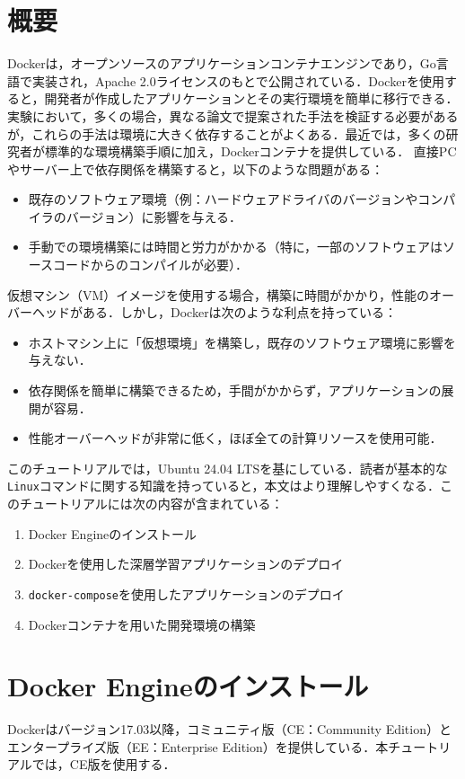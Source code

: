 \section{概要}
Dockerは，オープンソースのアプリケーションコンテナエンジンであり，Go言語で実装され，Apache 2.0ライセンスのもとで公開されている．Dockerを使用すると，開発者が作成したアプリケーションとその実行環境を簡単に移行できる．
実験において，多くの場合，異なる論文で提案された手法を検証する必要があるが，これらの手法は環境に大きく依存することがよくある．最近では，多くの研究者が標準的な環境構築手順に加え，Dockerコンテナを提供している．
直接PCやサーバー上で依存関係を構築すると，以下のような問題がある：
\begin{itemize}
    \item 既存のソフトウェア環境（例：ハードウェアドライバのバージョンやコンパイラのバージョン）に影響を与える．
    \item 手動での環境構築には時間と労力がかかる（特に，一部のソフトウェアはソースコードからのコンパイルが必要）．
\end{itemize}

仮想マシン（VM）イメージを使用する場合，構築に時間がかかり，性能のオーバーヘッドがある．しかし，Dockerは次のような利点を持っている：
\begin{itemize}
    \item ホストマシン上に「仮想環境」を構築し，既存のソフトウェア環境に影響を与えない．
    \item 依存関係を簡単に構築できるため，手間がかからず，アプリケーションの展開が容易．
    \item 性能オーバーヘッドが非常に低く，ほぼ全ての計算リソースを使用可能．
\end{itemize}

このチュートリアルでは，Ubuntu 24.04 LTSを基にしている．読者が基本的な\texttt{Linux}コマンドに関する知識を持っていると，本文はより理解しやすくなる．このチュートリアルには次の内容が含まれている：
\begin{enumerate}
    \item Docker Engineのインストール
    \item Dockerを使用した深層学習アプリケーションのデプロイ
    \item \texttt{docker-compose}を使用したアプリケーションのデプロイ
    \item Dockerコンテナを用いた開発環境の構築
\end{enumerate}
\section{Docker Engineのインストール}
Dockerはバージョン17.03以降，コミュニティ版（CE：Community Edition）とエンタープライズ版（EE：Enterprise Edition）を提供している．本チュートリアルでは，CE版を使用する．
